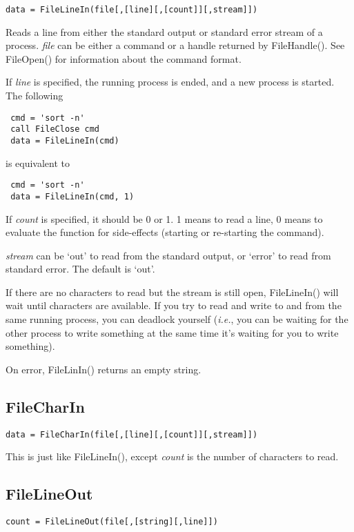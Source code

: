 \documentclass{article}
\begin{document}
\begin{verbatim}
data = FileLineIn(file[,[line][,[count]][,stream]])
\end{verbatim}

Reads a line from either the standard output or standard error stream of
a process. {\it file} can be either a command or a handle returned by
FileHandle(). See FileOpen() for information about the command format.

If {\it line} is specified, the running process is ended, and a new
process is started. The following
\begin{verbatim}
 cmd = 'sort -n'
 call FileClose cmd
 data = FileLineIn(cmd)
\end{verbatim}
is equivalent to
\begin{verbatim}
 cmd = 'sort -n'
 data = FileLineIn(cmd, 1)
\end{verbatim}

If {\it count} is specified, it should be 0 or 1. 1 means to read a
line, 0 means to evaluate the function for side-effects (starting or
re-starting the command).

{\it stream} can be `out' to read from the standard output, or `error'
to read from standard error. The default is `out'.

If there are no characters to read but the stream is still open,
FileLineIn() will wait until characters are available. If you try to
read and write to and from the same running process, you can deadlock
yourself ({\it i.e.}, you can be waiting for the other process to write
something at the same time it's waiting for you to write something).

On error, FileLinIn() returns an empty string.

\subsection{FileCharIn}

\begin{verbatim}
data = FileCharIn(file[,[line][,[count]][,stream]])
\end{verbatim}

This is just like FileLineIn(), except {\it count} is the number of
characters to read.

\subsection{FileLineOut}

\begin{verbatim}
count = FileLineOut(file[,[string][,line]])
\end{verbatim}
\end{document}
